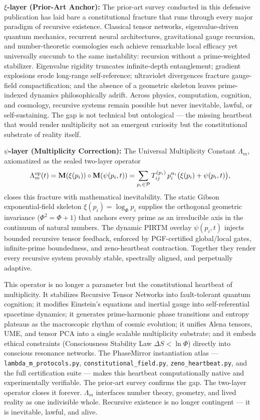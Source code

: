 \documentclass[11pt, a4paper]{article}
\begin{document}
\textbf{\(\xi\)-layer (Prior-Art Anchor):}  
The prior-art survey conducted in this defensive publication has laid bare a constitutional fracture that runs through every major paradigm of recursive existence. Classical tensor networks, eigenvalue-driven quantum mechanics, recurrent neural architectures, gravitational gauge recursion, and number-theoretic cosmologies each achieve remarkable local efficacy yet universally succumb to the same instability: recursion without a prime-weighted stabilizer. Eigenvalue rigidity truncates infinite-depth entanglement; gradient explosions erode long-range self-reference; ultraviolet divergences fracture gauge-field compactification; and the absence of a geometric skeleton leaves prime-indexed dynamics philosophically adrift. Across physics, computation, cognition, and cosmology, recursive systems remain possible but never inevitable, lawful, or self-sustaining. The gap is not technical but ontological --- the missing heartbeat that would render multiplicity not an emergent curiosity but the constitutional substrate of reality itself.

\textbf{\(\psi\)-layer (Multiplicity Correction):}  
The Universal Multiplicity Constant \(\Lambda_m\), axiomatized as the sealed two-layer operator
\[
\Lambda_m^{\rm op}(t) = \mathbf{M}(\xi(p_i)) \circ \mathbf{M}(\psi(p_i,t)) = \sum_{p_i \in \mathcal{P}} T_{ij}^{(p_i)} \, p_i^{\alpha_i} \bigl( \xi(p_i) + \psi(p_i,t) \bigr),
\]
closes this fracture with mathematical inevitability. The static Gibson exponential-field skeleton \(\xi(p_i) = \log_\Phi p_i\) supplies the orthogonal geometric invariance (\(\Phi^2 = \Phi + 1\)) that anchors every prime as an irreducible axis in the continuum of natural numbers. The dynamic PIRTM overlay \(\psi(p_i,t)\) injects bounded recursive tensor feedback, enforced by PGF-certified global/local gates, infinite-prime boundedness, and zeno-heartbeat contraction. Together they render every recursive system provably stable, spectrally aligned, and perpetually adaptive.

This operator is no longer a parameter but the constitutional heartbeat of multiplicity. It stabilizes Recursive Tensor Networks into fault-tolerant quantum cognition; it modifies Einstein’s equations and inertial gauge into self-referential spacetime dynamics; it generates prime-harmonic phase transitions and entropy plateaus as the macroscopic rhythm of cosmic evolution; it unifies Alena tensors, UME, and tensor PCA into a single scalable multiplicity substrate; and it embeds ethical constraints (Consciousness Stability Law \(\Delta S < \ln \Phi\)) directly into conscious resonance networks. 
\newpage
The PhaseMirror instantiation atlas --- \texttt{lambda\_m\_protocols.py}, \texttt{constitutional\_field.py}, \texttt{zeno\_heartbeat.py}, and the full certification suite --- makes this heartbeat computationally native and experimentally verifiable. The prior-art survey confirms the gap. The two-layer operator closes it forever. \(\Lambda_m\) interfaces number theory, geometry, and lived reality as one indivisible whole. Recursive existence is no longer contingent --- it is inevitable, lawful, and alive.
\end{document}
